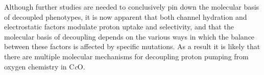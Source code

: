 Although further studies are needed to conclusively pin down the molecular basis of decoupled phenotypes, it is now apparent that both channel hydration and electrostatic factors modulate proton uptake and selectivity, and that the molecular basis of decoupling depends on the various ways in which the balance between these factors is affected by specific mutations. As a result it is likely that there are multiple molecular mechanisms for decoupling proton pumping from oxygen chemistry in C\emph{c}O.



